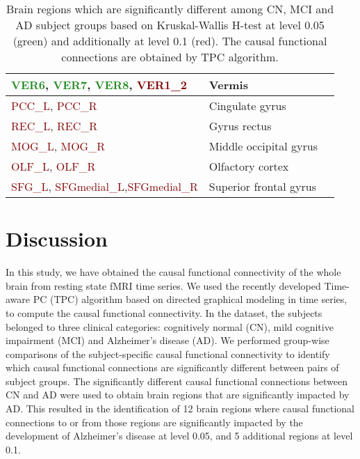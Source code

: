 \documentclass[12pt,reqno]{amsart}
\theoremstyle{definition}
\begin{document}
\begin{table}[h!]
{\begin{tabular}{p{2.4in}p{2in}c}
\textcolor{ForestGreen}{VER6}, \textcolor{ForestGreen}{VER7}, \textcolor{ForestGreen}{VER8},  \textcolor{Maroon}{VER1\_2} & Vermis & \citet{sjobeck2001alzheimer,a2013dendritic}\\
\midrule



\textcolor{Maroon}{PCC\_L}, \textcolor{Maroon}{PCC\_R} & Cingulate gyrus & \citet{villain2008relationships,caminiti2020imaging, mascali2015}\\
\midrule
\textcolor{Maroon}{REC\_L}, \textcolor{Maroon}{REC\_R} & Gyrus rectus & \citet{molsa1987alzheimer,nochlin1993comparison, sheline2010amyloid}\\
\midrule
\textcolor{Maroon}{MOG\_L}, \textcolor{Maroon}{MOG\_R} & Middle occipital gyrus & \citet{golby2005memory,frings2015asymmetries}\\
\midrule
\textcolor{Maroon}{OLF\_L}, \textcolor{Maroon}{OLF\_R} & Olfactory cortex & \citet{reyes1993olfactory, wang2010olfactory}\\
\midrule
\textcolor{Maroon}{SFG\_L}, \textcolor{Maroon}{SFGmedial\_L},\newline \textcolor{Maroon}{SFGmedial\_R} & 
Superior frontal gyrus & \citet{brachova1993association,lue1996inflammation} \\
\bottomrule\bottomrule
\end{tabular}
}
\caption{Brain regions which are significantly different among CN, MCI and AD subject groups based on Kruskal-Wallis H-test at level 0.05 (green) and additionally at level 0.1 (red). The causal functional connections are obtained by TPC algorithm.}
\label{tab:sigregions}

\end{table}
\restoregeometry




\section{Discussion}
In this study, we have obtained the causal functional connectivity of the whole brain from resting state fMRI time series. We used the recently developed Time-aware PC (TPC) algorithm based on directed graphical modeling in time series, to compute the causal functional connectivity. In the dataset, the subjects belonged to three clinical categories: cognitively normal (CN), mild cognitive impairment (MCI) and Alzheimer's disease (AD). We performed group-wise comparisons of the subject-specific causal functional connectivity to identify which causal functional connections are significantly different between pairs of subject groups. The significantly different causal functional connections between CN and AD were used to obtain brain regions that are significantly impacted by AD. This resulted in the identification of 12 brain regions where causal functional connections to or from those regions are significantly impacted by the development of Alzheimer's disease at level 0.05, and 5 additional regions at level 0.1.
\end{document}
